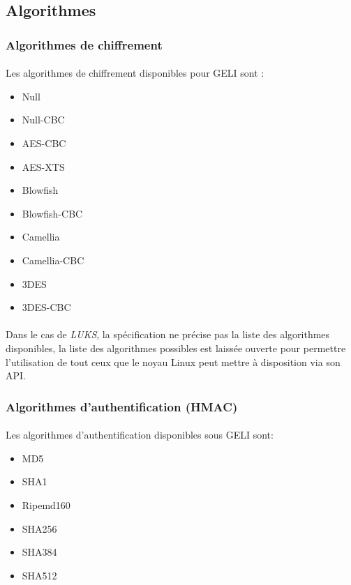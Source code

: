 \subsection{Algorithmes}
\subsubsection{Algorithmes de chiffrement}
\paragraph{}
Les algorithmes de chiffrement disponibles pour GELI \cite{geli.h} sont :
\begin{itemize}
	\item Null
	\item Null-CBC
	\item AES-CBC
	\item AES-XTS
	\item Blowfish
	\item Blowfish-CBC
	\item Camellia
	\item Camellia-CBC
	\item 3DES
	\item 3DES-CBC
\end{itemize}

\paragraph{}
Dans le cas de {\em LUKS}, la spécification \cite{onDiskFormatLuks}
ne précise pas la liste des algorithmes disponibles, la liste des algorithmes 
possibles est laissée ouverte pour permettre l'utilisation de tout ceux que le 
noyau Linux peut mettre à disposition via son API.

\subsubsection{Algorithmes d'authentification (HMAC)}
\paragraph{}
Les algorithmes d'authentification disponibles sous GELI sont:
\begin{itemize}
	\item MD5
	\item SHA1
	\item Ripemd160
	\item SHA256
	\item SHA384
	\item SHA512
\end{itemize}

